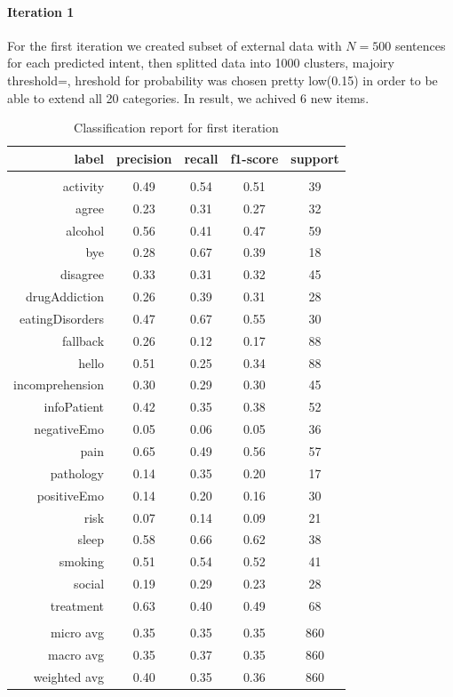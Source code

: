 \documentclass[11pt]{article}
\begin{document}
{\paragraph{Iteration 1} For the first iteration we created subset of external data with $N=500$ sentences for each predicted intent, then splitted data into 1000 clusters, majoiry threshold=, hreshold for probability was chosen pretty low(0.15) in order to be able to extend all 20 categories. In result, we achived 6 new items.

\begin{table}[htb]
\begin{center}
\begin{tabular}{ |r|c|c|c|c| }
\hline
label & precision & recall & f1-score &  support\\ \hline 
\\ \hline 
activity &  0.49 & 0.54 & 0.51 &   39\\ \hline 
agree &  0.23 & 0.31 & 0.27 &   32\\ \hline 
alcohol &  0.56 & 0.41 & 0.47 &   59\\ \hline 
bye &  0.28 & 0.67 & 0.39 &   18\\ \hline 
disagree &  0.33 & 0.31 & 0.32 &   45\\ \hline 
drugAddiction &  0.26 & 0.39 & 0.31 &   28\\ \hline 
eatingDisorders &  0.47 & 0.67 & 0.55 &   30\\ \hline 
fallback &  0.26 & 0.12 & 0.17 &   88\\ \hline 
hello &  0.51 & 0.25 & 0.34 &   88\\ \hline 
incomprehension &  0.30 & 0.29 & 0.30 &   45\\ \hline 
infoPatient &  0.42 & 0.35 & 0.38 &   52\\ \hline 
negativeEmo &  0.05 & 0.06 & 0.05 &   36\\ \hline 
pain &  0.65 & 0.49 & 0.56 &   57\\ \hline 
pathology &  0.14 & 0.35 & 0.20 &   17\\ \hline 
positiveEmo &  0.14 & 0.20 & 0.16 &   30\\ \hline 
risk &  0.07 & 0.14 & 0.09 &   21\\ \hline 
sleep &  0.58 & 0.66 & 0.62 &   38\\ \hline 
smoking &  0.51 & 0.54 & 0.52 &   41\\ \hline 
social &  0.19 & 0.29 & 0.23 &   28\\ \hline 
treatment &  0.63 & 0.40 & 0.49 &   68\\ \hline 
\\ \hline 
micro avg &  0.35 & 0.35 & 0.35 &  860\\ \hline 
macro avg &  0.35 & 0.37 & 0.35 &  860\\ \hline 
weighted avg &  0.40 & 0.35 & 0.36 &  860\\ \hline 
\end{tabular}
\caption{Classification report for first iteration}
\end{center}
\end{table}
\FloatBarrier


}
\end{document}
